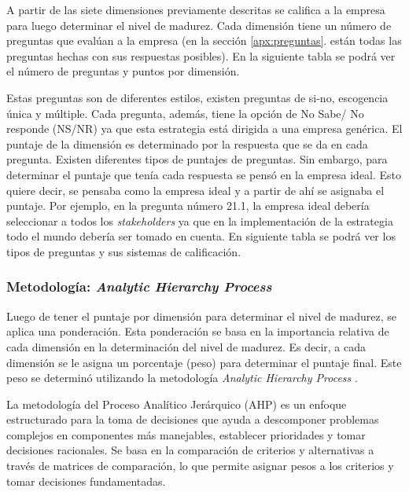 A partir de las siete dimensiones previamente descritas se califica a la empresa para luego determinar el nivel de madurez. Cada dimensión tiene un número de preguntas que evalúan a la empresa (en la sección \ref{apx:preguntas}.  están todas las preguntas hechas con sus respuestas posibles). En la siguiente tabla se podrá ver el número de preguntas y puntos por dimensión.



Estas preguntas son de diferentes estilos, existen preguntas de si-no, escogencia única y múltiple. Cada pregunta, además, tiene la opción de No Sabe/ No responde (NS/NR) ya que esta estrategia está dirigida a una empresa genérica. El puntaje de la dimensión es determinado por la respuesta que se da en cada pregunta. Existen diferentes tipos de puntajes de preguntas. Sin embargo, para determinar el puntaje que tenía cada respuesta se pensó en la empresa ideal. Esto quiere decir, se pensaba como la empresa ideal y a partir de ahí se asignaba el puntaje. Por ejemplo, en la pregunta número 21.1, la empresa ideal debería seleccionar a todos los \textit{stakeholders} ya que en la implementación de la estrategia todo el mundo debería ser tomado en cuenta. En siguiente tabla se podrá ver los tipos de preguntas y sus sistemas de calificación. 



\subsubsection{Metodología: \textit{Analytic Hierarchy Process}}
Luego de tener el puntaje por dimensión para determinar el nivel de madurez, se aplica una ponderación. Esta ponderación se basa en la importancia relativa de cada dimensión en la determinación del nivel de madurez. Es decir, a cada dimensión se le asigna un porcentaje (peso) para determinar el puntaje final. Este peso se determinó utilizando la metodología \textit{Analytic Hierarchy Process} \parencite{bahurmoz-2006}.

La metodología del Proceso Analítico Jerárquico (AHP) es un enfoque estructurado para la toma de decisiones que ayuda a descomponer problemas complejos en componentes más manejables, establecer prioridades y tomar decisiones racionales. Se basa en la comparación de criterios y alternativas a través de matrices de comparación, lo que permite asignar pesos a los criterios y tomar decisiones fundamentadas. 

